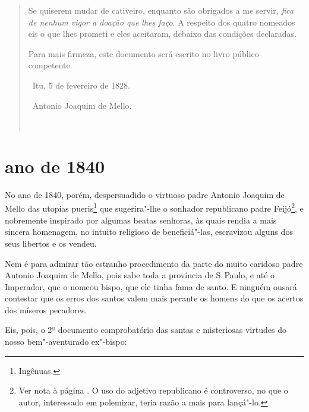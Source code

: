\begin{quote}
Se quiserem mudar de cativeiro, enquanto são obrigados a me servir,
\emph{fica de nenhum vigor a doação que lhes faço}. A respeito dos
quatro nomeados eis o que lhes prometi e eles aceitaram, debaixo das
condições declaradas.

Para mais firmeza, este documento será escrito no livro público
competente.

\hfill\ Itu, 5 de fevereiro de 1828.\smallskip

\hfill\ Antonio Joaquim de Mello.

\noindent\ 
\end{quote}


\section*{ano de 1840}

No ano de 1840, porém, despersuadido o virtuoso padre Antonio Joaquim de
Mello das utopias pueris\footnote{Ingênuas.} que sugerira"-lhe o
sonhador republicano padre Feijó\footnote{Ver nota à página \pageref{feijo}. O uso do
  adjetivo republicano é controverso, no que o autor, interessado em
  polemizar, teria razão a mais para lançá"-lo.}, e nobremente inspirado
por algumas beatas senhoras, às quais rendia a mais sincera homenagem,
no intuito religioso de beneficiá"-las, escravizou alguns dos seus
libertos e os vendeu.

Nem é para admirar tão estranho procedimento da parte do muito caridoso
padre Antonio Joaquim de Mello, pois sabe toda a província de S.\,Paulo,
e até o Imperador, que o nomeou bispo, que ele tinha fama de santo. E
ninguém ousará contestar que os erros dos santos valem mais perante os
homens do que os acertos dos míseros pecadores.

Eis, pois, o 2º documento comprobatório das santas e misteriosas
virtudes do nosso bem"-aventurado ex"-bispo:

